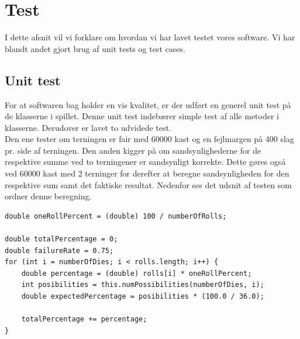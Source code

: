 \chapter{Test}

I dette afsnit vil vi forklare om hvordan vi har lavet testet vores software.
Vi har blandt andet gjort brug af unit tests og test cases.

\section{Unit test}

For at softwaren bag holder en vis kvalitet, er der udført en generel unit test på de klasserne i spillet.
Denne unit test indebærer simple test af alle metoder i klasserne.
Derudover er lavet to udvidede test.
\\
Den ene tester om terningen er fair med 60000 kast og en fejlmargen på 400 slag pr. side af terningen.
Den anden kigger på om sandsynlighederne for de respektive summe ved to terningener er sandsynligt korrekte.
Dette gøres også ved 60000 kast med 2 terninger for derefter at beregne sandsynligheden for den respektive sum samt det faktiske resultat.
Nedenfor ses det udsnit af testen som ordner denne beregning.
\\

\begin{lstlisting}
double oneRollPercent = (double) 100 / numberOfRolls;
    
double totalPercentage = 0;
double failureRate = 0.75;
for (int i = numberOfDies; i < rolls.length; i++) {
    double percentage = (double) rolls[i] * oneRollPercent;
    int posibilities = this.numPossibilities(numberOfDies, i);
    double expectedPercentage = posibilities * (100.0 / 36.0);

    totalPercentage += percentage;
}
\end{lstlisting}
\newpage
